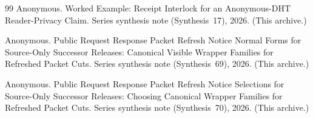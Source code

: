 \documentclass[11pt]{article}
\begin{document}
\begin{thebibliography}{99}
Anonymous.
\newblock Worked Example: Receipt Interlock for an Anonymous-DHT Reader-Privacy Claim.
\newblock Series synthesis note (Synthesis~17), 2026. (This archive.)



Anonymous.
\newblock Public Request Response Packet Refresh Notice Normal Forms for Source-Only Successor Releases: Canonical Visible Wrapper Families for Refreshed Packet Cuts.
\newblock Series synthesis note (Synthesis~69), 2026. (This archive.)

Anonymous.
\newblock Public Request Response Packet Refresh Notice Selections for Source-Only Successor Releases: Choosing Canonical Wrapper Families for Refreshed Packet Cuts.
\newblock Series synthesis note (Synthesis~70), 2026. (This archive.)

\end{thebibliography}
\end{document}
